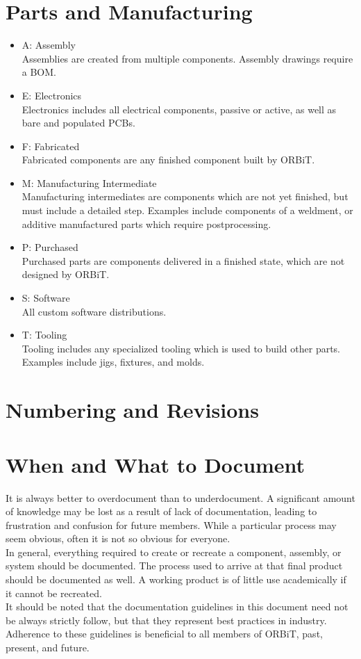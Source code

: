 \documentclass[12pt,article]{memoir}
\begin{document}
\newpage

\chapter{Parts and Manufacturing}
\begin{itemize}
\item A: Assembly\\
Assemblies are created from multiple components. Assembly drawings require a BOM.
\item E: Electronics\\
Electronics includes all electrical components, passive or active, as well as bare and populated PCBs.
\item F: Fabricated\\
Fabricated components are any finished component built by ORBiT.
\item M: Manufacturing Intermediate\\
Manufacturing intermediates are components which are not yet finished, but must include a detailed step. Examples include components of a weldment, or additive manufactured parts which require postprocessing.
\item P: Purchased\\
Purchased parts are components delivered in a finished state, which are not designed by ORBiT.
\item S: Software\\
All custom software distributions.
\item T: Tooling\\
Tooling includes any specialized tooling which is used to build other parts. Examples include jigs, fixtures, and molds.
\end{itemize}

\newpage

\chapter{Numbering and Revisions}



\newpage

\chapter{When and What to Document}
It is always better to overdocument than to underdocument. A significant amount of knowledge may be lost as a result of lack of documentation, leading to frustration and confusion for future members. While a particular process may seem obvious, often it is not so obvious for everyone.\\
In general, everything required to create or recreate a component, assembly, or system should be documented. The process used to arrive at that final product should be documented as well. A working product is of little use academically if it cannot be recreated.\\
It should be noted that the documentation guidelines in this document need not be always strictly follow, but that they represent best practices in industry. Adherence to these guidelines is beneficial to all members of ORBiT, past, present, and future.

\end{document}
